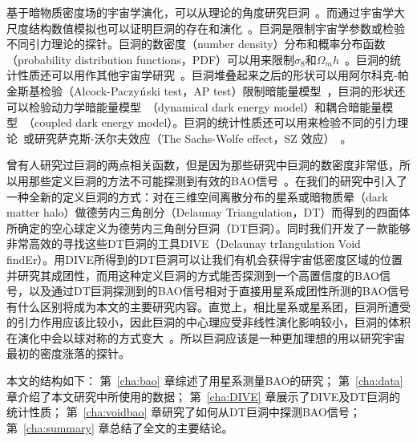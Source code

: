 基于暗物质密度场的宇宙学演化，可以从理论的角度研究巨洞~\cite{Doroshkevich1970,Zeldovich1970,Hahn2007}。而通过宇宙学大尺度结构数值模拟也可以证明巨洞的存在和演化~\cite{SW04,Colberg2005, 2006MNRAS.367.1629S, Platen2007, Neyrinck2008, Forero-Romero2009, 2012MNRAS.425.2049H, 2013MNRAS.429.1286C}。巨洞是限制宇宙学参数或检验不同引力理论的探针。巨洞的数密度（number density）分布和概率分布函数（probability distribution functions，PDF）可以用来限制$\sigma_8$和$\Omega_m h$~\cite{BPP09,2015arXiv151104075S}。巨洞的统计性质还可以用作其他宇宙学研究~\cite{W79,PP86,B90,EEG91,BL02}。巨洞堆叠起来之后的形状可以用阿尔科克-帕金斯基检验（Alcock-Paczy$\acute{\rm n}$ski test，AP test）限制暗能量模型~\cite{PL07,LW10,Pisani2015PRD}，巨洞的形状还可以检验动力学暗能量模型~\cite{B12}（dynamical dark energy model）和耦合暗能量模型~\cite{L11}（coupled dark energy model）。巨洞的统计性质还可以用来检验不同的引力理论~\cite{MS09,LZK12,CC13,LCC15,Cai2015}或研究萨克斯-沃尔夫效应（The Sachs-Wolfe effect，SZ 效应）~\cite{GNS08,ILD13,Cai2014,HNG15,PLANCKISW14}。

曾有人研究过巨洞的两点相关函数，但是因为那些研究中巨洞的数密度非常低，所以用那些定义巨洞的方法不可能探测到有效的BAO信号~\cite{Padilla2005,Patiri2006372,VBT12,CC13,CJS15}。在我们的研究中引入了一种全新的定义巨洞的方式：对在三维空间离散分布的星系或暗物质晕（dark matter halo）做德劳内三角剖分（Delaunay Triangulation，DT）而得到的四面体所确定的空心球定义为德劳内三角剖分巨洞（DT巨洞）。同时我们开发了一款能够非常高效的寻找这些DT巨洞的工具DIVE（Delaunay trIangulation Void findEr）。用DIVE所得到的DT巨洞可以让我们有机会获得宇宙低密度区域的位置并研究其成团性，而用这种定义巨洞的方式能否探测到一个高置信度的BAO信号，以及通过DT巨洞探测到的BAO信号相对于直接用星系成团性所测的BAO信号有什么区别将成为本文的主要研究内容。直觉上，相比星系或星系团，巨洞所遭受的引力作用应该比较小，因此巨洞的中心理应受非线性演化影响较小，巨洞的体积在演化中会以球对称的方式变大~\cite{SW04}。所以巨洞应该是一种更加理想的用以研究宇宙最初的密度涨落的探针。

本文的结构如下：
第~\ref{cha:bao} 章综述了用星系测量BAO的研究；
第~\ref{cha:data} 章介绍了本文研究中所使用的数据；
第~\ref{cha:DIVE} 章展示了DIVE及DT巨洞的统计性质；
第~\ref{cha:voidbao} 章研究了如何从DT巨洞中探测BAO信号；
第~\ref{cha:summary} 章总结了全文的主要结论。

